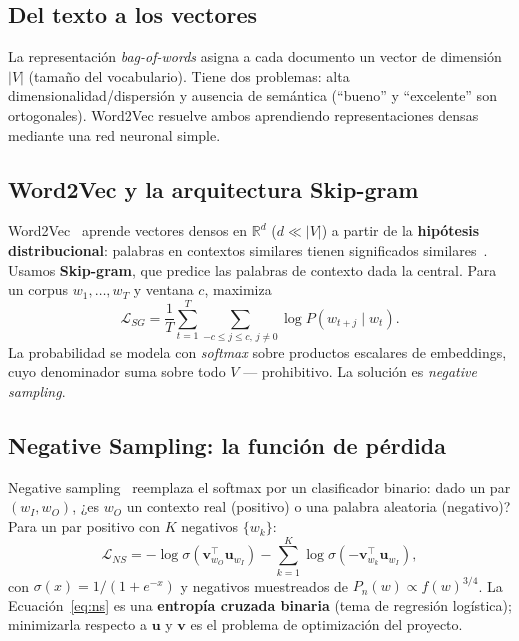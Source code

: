 \documentclass[11pt]{article}
\begin{document}
\subsection{Del texto a los vectores}
La representación \emph{bag-of-words} asigna a cada documento un vector de dimensión $|V|$
(tamaño del vocabulario). Tiene dos problemas: alta dimensionalidad/dispersión y ausencia de
semántica (``bueno'' y ``excelente'' son ortogonales). Word2Vec resuelve ambos aprendiendo
representaciones densas mediante una red neuronal simple.

\subsection{Word2Vec y la arquitectura Skip-gram}
Word2Vec~\cite{mikolov2013a} aprende vectores densos en $\mathbb{R}^d$ ($d\ll|V|$) a partir
de la \textbf{hipótesis distribucional}: palabras en contextos similares tienen significados
similares~\cite{harris1954}. Usamos \textbf{Skip-gram}, que predice las palabras de contexto
dada la central. Para un corpus $w_1,\dots,w_T$ y ventana $c$, maximiza
\begin{equation}
\mathcal{L}_{SG} = \frac{1}{T}\sum_{t=1}^{T}\sum_{-c\le j\le c,\, j\ne 0}
\log P(w_{t+j}\mid w_t).
\end{equation}
La probabilidad se modela con \emph{softmax} sobre productos escalares de embeddings, cuyo
denominador suma sobre todo $V$ --- prohibitivo. La solución es \emph{negative sampling}.

\subsection{Negative Sampling: la función de pérdida}
Negative sampling~\cite{mikolov2013b} reemplaza el softmax por un clasificador binario: dado
un par $(w_I,w_O)$, ¿es $w_O$ un contexto real (positivo) o una palabra aleatoria (negativo)?
Para un par positivo con $K$ negativos $\{w_k\}$:
\begin{equation}\label{eq:ns}
\mathcal{L}_{NS} = -\log\sigma\!\left(\mathbf{v}_{w_O}^{\top}\mathbf{u}_{w_I}\right)
- \sum_{k=1}^{K}\log\sigma\!\left(-\mathbf{v}_{w_k}^{\top}\mathbf{u}_{w_I}\right),
\end{equation}
con $\sigma(x)=1/(1+e^{-x})$ y negativos muestreados de $P_n(w)\propto f(w)^{3/4}$. La
Ecuación~\eqref{eq:ns} es una \textbf{entropía cruzada binaria} (tema de regresión
logística); minimizarla respecto a $\mathbf{u}$ y $\mathbf{v}$ es el problema de
optimización del proyecto.
\end{document}
